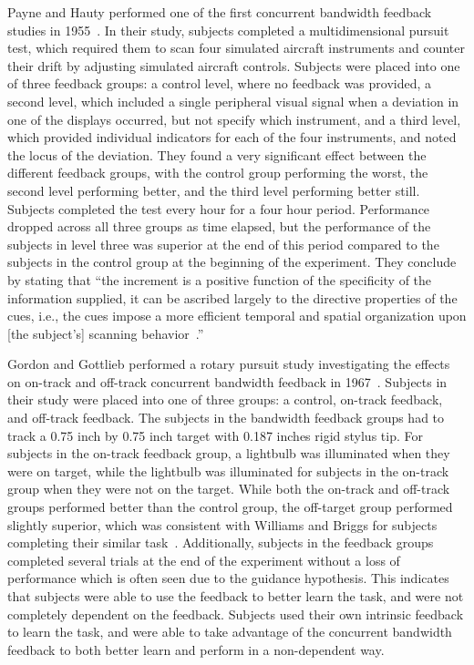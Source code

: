 \documentclass{paper}
\begin{document}
Payne and Hauty performed one of the first concurrent bandwidth feedback studies in 1955~\cite{payne1955effect}.
In their study, subjects completed a multidimensional pursuit test, which required them to scan four simulated aircraft instruments and counter their drift by adjusting simulated aircraft controls.
Subjects were placed into one of three feedback groups: a control level, where no feedback was provided, a second level, which included a single peripheral visual signal when a deviation in one of the displays occurred, but not specify which instrument, and a third level, which provided individual indicators for each of the four instruments, and noted the locus of the deviation.
They found a very significant effect between the different feedback groups, with the control group performing the worst, the second level performing better, and the third level performing better still.
Subjects completed the test every hour for a four hour period.
Performance dropped across all three groups as time elapsed, but the performance of the subjects in level three was superior at the end of this period compared to the subjects in the control group at the beginning of the experiment.
They conclude by stating that ``the increment is a positive function of the specificity of the information supplied, it can be ascribed largely to the directive properties of the cues, i.e., the cues impose a more efficient temporal and spatial organization upon [the subject's] scanning behavior~\cite{payne1955effect}.''

Gordon and Gottlieb performed a rotary pursuit study investigating the effects on on-track and off-track concurrent bandwidth feedback in 1967~\cite{Gordon1967}.
Subjects in their study were placed into one of three groups: a control, on-track feedback, and off-track feedback.
The subjects in the bandwidth feedback groups had to track a 0.75 inch by 0.75 inch target with 0.187 inches rigid stylus tip.
For subjects in the on-track feedback group, a lightbulb was illuminated when they were on target, while the lightbulb was illuminated for subjects in the on-track group when they were not on the target.
While both the on-track and off-track groups performed better than the control group, the off-target group performed slightly superior, which was consistent with Williams and Briggs for subjects completing their similar task~\cite{williams1962target}.
Additionally, subjects in the feedback groups completed several trials at the end of the experiment without a loss of performance which is often seen due to the guidance hypothesis.
This indicates that subjects were able to use the feedback to better learn the task, and were not completely dependent on the feedback.
Subjects used their own intrinsic feedback to learn the task, and were able to take advantage of the concurrent bandwidth feedback to both better learn and perform in a non-dependent way.
\end{document}
